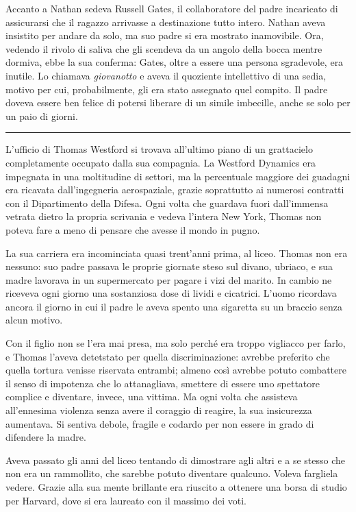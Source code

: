 \documentclass[a4paper,oneside,11pt]{memoir}
\begin{document}
Accanto a Nathan sedeva Russell Gates, il collaboratore del padre incaricato di
assicurarsi che il ragazzo arrivasse a destinazione tutto intero. Nathan aveva
insistito per andare da solo, ma suo padre si era mostrato inamovibile. Ora,
vedendo il rivolo di saliva che gli scendeva da un angolo della bocca mentre
dormiva, ebbe la sua conferma: Gates, oltre a essere una persona sgradevole, era
inutile. Lo chiamava \emph{giovanotto} e aveva il quoziente intellettivo di una
sedia, motivo per cui, probabilmente, gli era stato assegnato quel compito. Il
padre doveva essere ben felice di potersi liberare di un simile imbecille, anche
se solo per un paio di giorni.

\plainbreak{1}

L'ufficio di Thomas Westford si trovava all'ultimo piano di un grattacielo
completamente occupato dalla sua compagnia. La Westford Dynamics era impegnata
in una moltitudine di settori, ma la percentuale maggiore dei guadagni era
ricavata dall'ingegneria aerospaziale, grazie soprattutto ai numerosi contratti
con il Dipartimento della Difesa. Ogni volta che guardava fuori dall'immensa
vetrata dietro la propria scrivania e vedeva l'intera New York, Thomas non
poteva fare a meno di pensare che avesse il mondo in pugno.

La sua carriera era incominciata quasi trent'anni prima, al liceo. Thomas non
era nessuno: suo padre passava le proprie giornate steso sul divano, ubriaco, e
sua madre lavorava in un supermercato per pagare i vizi del marito. In cambio ne
riceveva ogni giorno una sostanziosa dose di lividi e cicatrici. L'uomo
ricordava ancora il giorno in cui il padre le aveva spento una sigaretta su un
braccio senza alcun motivo.

Con il figlio non se l'era mai presa, ma solo perché era troppo vigliacco per
farlo, e Thomas l'aveva detetstato per quella discriminazione: avrebbe preferito
che quella tortura venisse riservata entrambi; almeno così avrebbe potuto
combattere il senso di impotenza che lo attanagliava, smettere di essere uno
spettatore complice e diventare, invece, una vittima. Ma ogni volta che
assisteva all'ennesima violenza senza avere il coraggio di reagire, la sua
insicurezza aumentava. Si sentiva debole, fragile e codardo per non essere in
grado di difendere la madre.

Aveva passato gli anni del liceo tentando di dimostrare agli altri e a se stesso
che non era un rammollito, che sarebbe potuto diventare qualcuno. Voleva
fargliela vedere. Grazie alla sua mente brillante era riuscito a ottenere una
borsa di studio per Harvard, dove si era laureato con il massimo dei voti.
\end{document}
